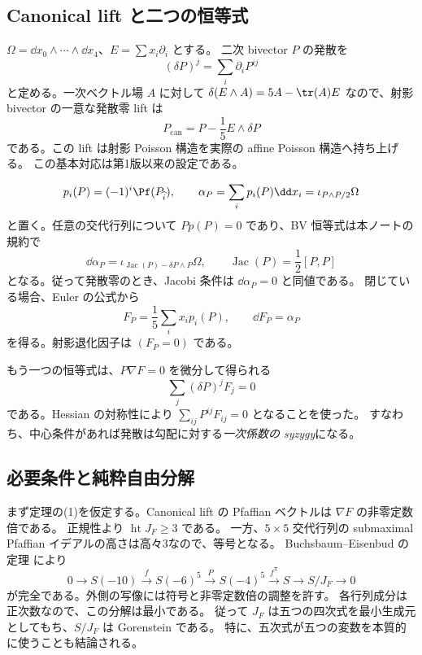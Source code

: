 \subsection{Canonical lift と二つの恒等式}

$\Omega=\dd x_0\wedge\cdots\wedge\dd x_4$、$E=\sum x_i\partial_i$ とする。
二次 bivector $P$ の発散を
\[
 (\delta P)^j=\sum_i\partial_iP^{ij}
\]
と定める。一次ベクトル場 $A$ に対して
$\delta(E\wedge A)=5A-\tr(A)E$ なので、射影 bivector の一意な発散零 lift は
\[
                  P_{\mathrm{can}}=P-\frac15 E\wedge\delta P
\]
である。この lift は射影 Poisson 構造を実際の affine Poisson 構造へ持ち上げる。
この基本対応は第1版以来の設定である。

\[
 p_i(P)=(-1)^i\Pf(P_{\widehat i}),\qquad
 \alpha_P=\sum_i p_i(P)\dd x_i=\iota_{P\wedge P/2}\Omega
\]
と置く。任意の交代行列について $Pp(P)=0$ であり、BV 恒等式は本ノートの規約で
\begin{equation}\label{eq:BV}
 \dd\alpha_P=\iota_{\operatorname{Jac}(P)-\delta P\wedge P}\Omega,
 \qquad \operatorname{Jac}(P)=\frac12[P,P]
\end{equation}
となる。従って発散零のとき、Jacobi 条件は $\dd\alpha_P=0$ と同値である。
閉じている場合、Euler の公式から
\[
       F_P=\frac15\sum_i x_i p_i(P),\qquad \dd F_P=\alpha_P
\]
を得る。射影退化因子は $(F_P=0)$ である。

もう一つの恒等式は、$P\nabla F=0$ を微分して得られる
\begin{equation}\label{eq:div-syzygy}
               \sum_j(\delta P)^jF_j=0
\end{equation}
である。Hessian の対称性により $\sum_{ij}P^{ij}F_{ij}=0$ となることを使った。
すなわち、中心条件があれば発散は勾配に対する\emph{一次係数の syzygy}になる。

\subsection{必要条件と純粋自由分解}

まず定理の(1)を仮定する。Canonical lift の Pfaffian ベクトルは $\nabla F$ の非零定数倍である。
正規性より $\operatorname{ht}J_F\ge3$ である。
一方、$5\times5$ 交代行列の submaximal Pfaffian イデアルの高さは高々3なので、等号となる。
Buchsbaum--Eisenbud の定理 \cite{BE} により
\begin{equation}\label{eq:BE-resolution}
 0\longrightarrow S(-10)\xrightarrow{f}
 S(-6)^5\xrightarrow{P}S(-4)^5\xrightarrow{f^{\mathsf T}}S
 \longrightarrow S/J_F\longrightarrow0
\end{equation}
が完全である。外側の写像には符号と非零定数倍の調整を許す。
各行列成分は正次数なので、この分解は最小である。
従って $J_F$ は五つの四次式を最小生成元としてもち、$S/J_F$ は Gorenstein である。
特に、五次式が五つの変数を本質的に使うことも結論される。


